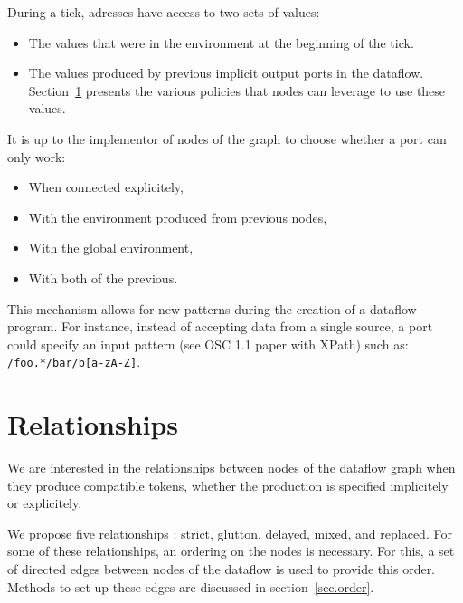 \documentclass{article}
\begin{document}
    During a tick, adresses have access to two sets of values: 
    \begin{itemize}
        \item The values that were in the environment at the beginning of the tick.
        \item The values produced by previous implicit output ports in the dataflow.
        Section~\ref{sec.relationships} presents the various policies that nodes can leverage to 
        use these values.
    \end{itemize}

    It is up to the implementor of nodes of the graph to choose whether a port can only work: 
    \begin{itemize}
        \item When connected explicitely,
        \item With the environment produced from previous nodes,
        \item With the global environment,
        \item With both of the previous.
    \end{itemize} 

    This mechanism allows for new patterns during the creation of a dataflow program.
    For instance, instead of accepting data from a single source, a port could specify an input pattern (see OSC 1.1 paper with XPath) such as: \lstinline|/foo.*/bar/b[a-zA-Z]|.
	
	
    
	\section{Relationships}
    \label{sec.relationships}
    We are interested in the relationships between nodes of the dataflow graph when they produce compatible tokens, whether the production is specified implicitely or explicitely.
    
    We propose five relationships : strict, glutton, delayed, mixed, and replaced. 
    For some of these relationships, an ordering on the nodes is necessary. 
    For this, a set of directed edges between nodes of the dataflow is used to provide this order.
    Methods to set up these edges are discussed in section~\ref{sec.order}.
    
\end{document}
